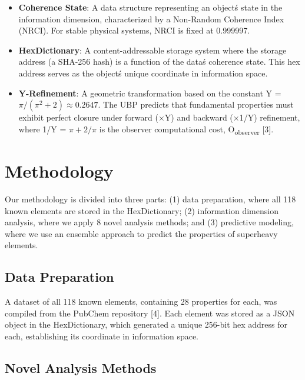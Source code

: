 \documentclass[12pt, a4paper]{article}
\begin{document}
\begin{itemize}
    \item \textbf{Coherence State}: A data structure representing an object\'s state in the information dimension, characterized by a Non-Random Coherence Index (NRCI). For stable physical systems, NRCI is fixed at 0.999997.
    \item \textbf{HexDictionary}: A content-addressable storage system where the storage address (a SHA-256 hash) is a function of the data\'s coherence state. This hex address serves as the object\'s unique coordinate in information space.
    \item \textbf{Y-Refinement}: A geometric transformation based on the constant Y = $\pi / (\pi^2 + 2) \approx 0.2647$. The UBP predicts that fundamental properties must exhibit perfect closure under forward ($\times$Y) and backward ($\times$1/Y) refinement, where 1/Y = $\pi + 2/\pi$ is the observer computational cost, O\textsubscript{observer} [3].
\end{itemize}


\section{Methodology}

Our methodology is divided into three parts: (1) data preparation, where all 118 known elements are stored in the HexDictionary; (2) information dimension analysis, where we apply 8 novel analysis methods; and (3) predictive modeling, where we use an ensemble approach to predict the properties of superheavy elements.

\subsection{Data Preparation}

A dataset of all 118 known elements, containing 28 properties for each, was compiled from the PubChem repository [4]. Each element was stored as a JSON object in the HexDictionary, which generated a unique 256-bit hex address for each, establishing its coordinate in information space.

\subsection{Novel Analysis Methods}
\end{document}
